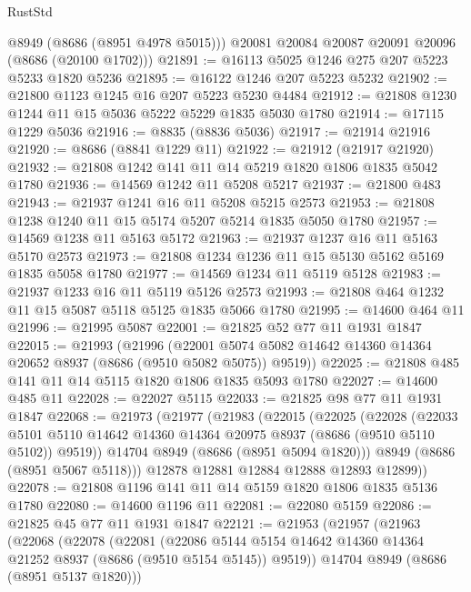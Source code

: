 \begin{lexlean}{RustStd}
\begin{coremodule}
        @8949
        (@8686 (@8951 @4978 @5015)))
      @20081
      @20084
      @20087
      @20091
      @20096
      (@8686 (@20100 @1702)))
@21891 := @16113 @5025 @1246 @275 @207 @5223 @5233 @1820 @5236
@21895 := @16122 @1246 @207 @5223 @5232
@21902 := @21800 @1123 @1245 @16 @207 @5223 @5230 @4484
@21912 := @21808 @1230 @1244 @11 @15 @5036 @5222 @5229 @1835 @5030 @1780
@21914 := @17115 @1229 @5036
@21916 := @8835 (@8836 @5036)
@21917 := @21914 @21916
@21920 := @8686 (@8841 @1229 @11)
@21922 := @21912 (@21917 @21920)
@21932 := @21808 @1242 @141 @11 @14 @5219 @1820 @1806 @1835 @5042 @1780
@21936 := @14569 @1242 @11 @5208 @5217
@21937 := @21800 @483
@21943 := @21937 @1241 @16 @11 @5208 @5215 @2573
@21953 := @21808 @1238 @1240 @11 @15 @5174 @5207 @5214 @1835 @5050 @1780
@21957 := @14569 @1238 @11 @5163 @5172
@21963 := @21937 @1237 @16 @11 @5163 @5170 @2573
@21973 := @21808 @1234 @1236 @11 @15 @5130 @5162 @5169 @1835 @5058 @1780
@21977 := @14569 @1234 @11 @5119 @5128
@21983 := @21937 @1233 @16 @11 @5119 @5126 @2573
@21993 := @21808 @464 @1232 @11 @15 @5087 @5118 @5125 @1835 @5066 @1780
@21995 := @14600 @464 @11
@21996 := @21995 @5087
@22001 := @21825 @52 @77 @11 @1931 @1847
@22015 := @21993
    (@21996
      (@22001 @5074 @5082 @14642 @14360 @14364 @20652 @8937 (@8686 (@9510 @5082 @5075)) @9519))
@22025 := @21808 @485 @141 @11 @14 @5115 @1820 @1806 @1835 @5093 @1780
@22027 := @14600 @485 @11
@22028 := @22027 @5115
@22033 := @21825 @98 @77 @11 @1931 @1847
@22068 := @21973
    (@21977
      (@21983
        (@22015
          (@22025
            (@22028
              (@22033
                @5101
                @5110
                @14642
                @14360
                @14364
                @20975
                @8937
                (@8686 (@9510 @5110 @5102))
                @9519))
            @14704
            @8949
            (@8686 (@8951 @5094 @1820)))
          @8949
          (@8686 (@8951 @5067 @5118)))
        @12878
        @12881
        @12884
        @12888
        @12893
        @12899))
@22078 := @21808 @1196 @141 @11 @14 @5159 @1820 @1806 @1835 @5136 @1780
@22080 := @14600 @1196 @11
@22081 := @22080 @5159
@22086 := @21825 @45 @77 @11 @1931 @1847
@22121 := @21953
    (@21957
      (@21963
        (@22068
          (@22078
            (@22081
              (@22086
                @5144
                @5154
                @14642
                @14360
                @14364
                @21252
                @8937
                (@8686 (@9510 @5154 @5145))
                @9519))
            @14704
            @8949
            (@8686 (@8951 @5137 @1820)))

\end{coremodule}
\end{lexlean}
